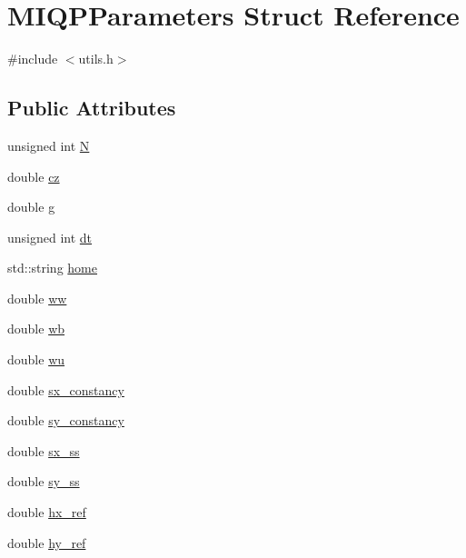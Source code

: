 \hypertarget{structMIQPParameters}{\section{\-M\-I\-Q\-P\-Parameters \-Struct \-Reference}
\label{structMIQPParameters}
}


{\ttfamily \#include $<$utils.\-h$>$}

\subsection*{\-Public \-Attributes}
\begin{DoxyCompactItemize}
\item 
unsigned int \hyperlink{structMIQPParameters_a7545bc29708292cbfca22b0446180f7c}{\-N}
\item 
double \hyperlink{structMIQPParameters_ab8158e2bf119d70c9856b6a277e3c42a}{cz}
\item 
double \hyperlink{structMIQPParameters_a31eca71d200b5b1468bd60b3266d0688}{g}
\item 
unsigned int \hyperlink{structMIQPParameters_ab4fca30503423e047dc55d27f0c9f3c9}{dt}
\item 
std\-::string \hyperlink{structMIQPParameters_a351843e2933021d2ed3abb00a9d001ff}{home}
\item 
double \hyperlink{structMIQPParameters_a7223a1cda1e4565d18729f1e7bba87e0}{ww}
\item 
double \hyperlink{structMIQPParameters_a6bc828e6060bfd69c3d6353a460de86b}{wb}
\item 
double \hyperlink{structMIQPParameters_aed141afdcc25904d53526a5f2c977427}{wu}
\item 
double \hyperlink{structMIQPParameters_ae7f08901a6a4bd6850cf232496d1c231}{sx\-\_\-constancy}
\item 
double \hyperlink{structMIQPParameters_a1dd5e07b3f05ddf30ecbe878caf4de38}{sy\-\_\-constancy}
\item 
double \hyperlink{structMIQPParameters_af8a016a12ecffd0751307c7d869472e9}{sx\-\_\-ss}
\item 
double \hyperlink{structMIQPParameters_a3c473019e93f8191f288edfe6999f4c1}{sy\-\_\-ss}
\item 
double \hyperlink{structMIQPParameters_a0346212871459ae33b79af6f9af49d5f}{hx\-\_\-ref}
\item 
double \hyperlink{structMIQPParameters_a09fe82db83af3f8ab0e891968daa7996}{hy\-\_\-ref}
\item 

\end{DoxyCompactItemize}
